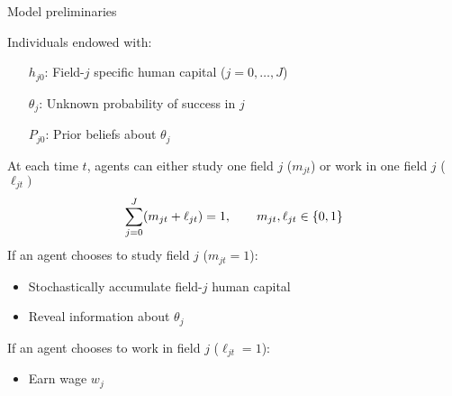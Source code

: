 
\begin{frame}{Model preliminaries}




% 

Individuals endowed with:
\begin{itemize}
    \item [$h_{j0}$:] Field-$j$ specific human capital ($j=0,\dots,J$)
    \item [$\theta_j$:] Unknown probability of success in $j$
    \item [$P_{j0}$:] Prior beliefs about $\theta_j$
\end{itemize}



\vspace{2ex}
At each time $t$, agents can either study one field $j$ ($m_{jt}$) or work in one field $j$ ($\ell_{jt})$
\begin{equation*}
    \sum_{j=0}^J (m_{jt} + \ell_{jt}) = 1, \quad \quad m_{jt}, \ell_{jt} \in \{0, 1\}
\end{equation*}
If an agent chooses to study field $j$ ($m_{jt} = 1$):
  \begin{itemize}
    \item Stochastically accumulate field-$j$ human capital
    \item Reveal information about $\theta_j$
  \end{itemize}
If an agent chooses to work in field $j$ ($\ell_{jt} = 1$):
  \begin{itemize}
    \item Earn wage $w_j$
  \end{itemize}



\end{frame}
